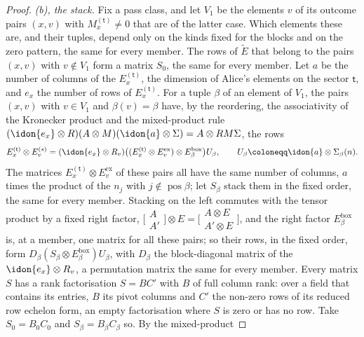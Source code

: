 \begin{proof}
\emph{(b), the stack.} Fix a pass class, and let $V_1$ be the elements $v$ of
its outcome pairs $(x,v)$ with $M^{(\mathsf t)}_{x}\ne0$ that are of the
latter case. Which elements these are, and their tuples, depend only on the
kinds fixed for the blocks and on the zero pattern, the same for every member.
The rows of $\widetilde E$ that belong to the pairs $(x,v)$ with
$v\notin V_1$ form a matrix $S_0$, the same for every member. Let $a$ be the
number of columns of the $E^{(\mathsf t)}_{x}$, the dimension of Alice's
elements on the sector $\mathsf t$, and $e_x$ the number of rows of
$E^{(\mathsf t)}_{x}$. For a tuple $\beta$ of an element of $V_1$, the pairs
$(x,v)$ with $v\in V_1$ and $\beta(v)=\beta$ have, by the reordering, the
associativity of the Kronecker product and the mixed-product rule
$(\idon{e_x}\otimes R)(A\otimes M)(\idon{a}\otimes\Sigma)=A\otimes RM\Sigma$,
the rows
\begin{equation*}
  E^{(\mathsf t)}_{x}\otimes E^{(s)}_v=(\idon{e_x}\otimes R_v)
  \big((E^{(\mathsf t)}_{x}\otimes E^{\mathrm{ex}}_v)\otimes
  E^{\mathrm{box}}_{\beta}\big)U_{\beta},\qquad
  U_{\beta}\coloneqq\idon{a}\otimes\Sigma_{\beta}(n).
\end{equation*}
The matrices $E^{(\mathsf t)}_{x}\otimes E^{\mathrm{ex}}_v$ of these pairs
all have the same number of columns, $a$ times the product of the $n_j$
with $j\notin\operatorname{pos}\beta$; let
$S_{\beta}$ stack them in the fixed order, the same for every member.
Stacking on the left commutes with the tensor product by a fixed right
factor, $\big[\begin{smallmatrix}A\\ A'\end{smallmatrix}\big]\otimes
E=\big[\begin{smallmatrix}A\otimes E\\ A'\otimes E\end{smallmatrix}\big]$,
and the right factor $E^{\mathrm{box}}_{\beta}$ is, at a member, one matrix
for all these pairs; so their rows, in the fixed order, form
$D_{\beta}(S_{\beta}\otimes E^{\mathrm{box}}_{\beta})U_{\beta}$, with
$D_{\beta}$ the block-diagonal matrix of the $\idon{e_x}\otimes R_v$, a
permutation matrix the same for every member. Every matrix $S$ has a rank
factorisation $S=BC'$ with $B$ of full column rank: over a field that contains
its entries, $B$ its pivot columns and $C'$ the non-zero rows of its reduced
row echelon form, an empty factorisation where $S$ is zero or has no row. Take
$S_0=B_0C_0$ and $S_{\beta}=B_{\beta}C_{\beta}$ so. By the mixed-product

\end{proof}
